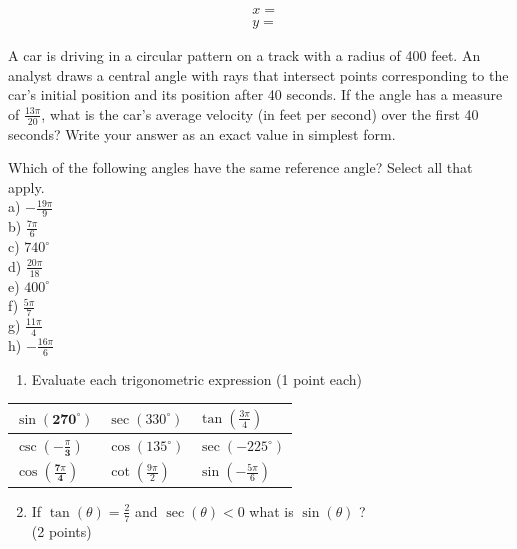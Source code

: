 \documentclass[10pt]{article}
\begin{document}
$$
\begin{aligned}
& x= \\
& y=
\end{aligned}
$$

A car is driving in a circular pattern on a track with a radius of 400 feet. An analyst draws a central angle with rays that intersect points corresponding to the car's initial position and its position after 40 seconds. If the angle has a measure of $\frac{13 \pi}{20}$, what is the car's average velocity (in feet per second) over the first 40 seconds? Write your answer as an exact value in simplest form.

Which of the following angles have the same reference angle? Select all that apply.\\
a) $-\frac{19 \pi}{9}$\\
b) $\frac{7 \pi}{6}$\\
c) $740^{\circ}$\\
d) $\frac{20 \pi}{18}$\\
e) $400^{\circ}$\\
f) $\frac{5 \pi}{7}$\\
g) $\frac{11 \pi}{4}$\\
h) $-\frac{16 \pi}{6}$

\begin{enumerate}
  \item Evaluate each trigonometric expression (1 point each)
\end{enumerate}

\begin{center}
\begin{tabular}{|l|l|l|}
\hline
$\sin \left(\mathbf{2 7 0}^{\circ}\right)$ & $\sec \left(330^{\circ}\right)$ & $\tan \left(\frac{3 \pi}{4}\right)$ \\
\hline
$\csc \left(-\frac{\pi}{\mathbf{3}}\right)$ & $\cos \left(135^{\circ}\right)$ & $\sec \left(-225^{\circ}\right)$ \\
\hline
$\cos \left(\frac{\mathbf{7} \pi}{\mathbf{4}}\right)$ & $\cot \left(\frac{9 \pi}{2}\right)$ & $\sin \left(-\frac{5 \pi}{6}\right)$ \\
\hline
\end{tabular}
\end{center}

\begin{enumerate}
  \setcounter{enumi}{1}
  \item If $\tan (\theta)=\frac{2}{7}$ and $\sec (\theta)<0$ what is $\sin (\theta)$ ?\\
(2 points)
\end{enumerate}
\end{document}
